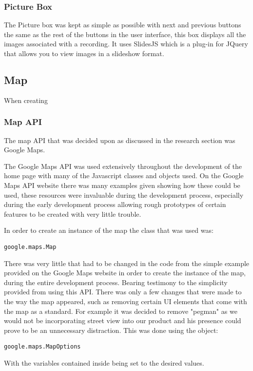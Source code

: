 \documentclass{l3proj}
\begin{document}
\subsubsection{Picture Box}

The Picture box was kept as simple as possible with next and previous buttons the same as the rest of the buttons in the user interface, this box displays all the images associated with a recording. It uses SlidesJS which is a plug-in for JQuery that allows you to view images in a slideshow format.

\subsection{Map}

When creating

\subsubsection{Map API}

The map API that was decided upon as discussed in the research section was Google Maps.

The Google Maps API was used extensively throughout the development of the home page with many of the Javascript classes and objects used. On the Google Maps API website there was many examples given showing how these could be used, these resources were invaluable during the development process, especially during the early development process allowing rough prototypes of certain features to be created with very little trouble.

In order to create an instance of the map the class that was used was:
\begin{verbatim}
google.maps.Map
\end{verbatim}
There was very little that had to be changed in the code from the simple example provided on the Google Maps website in order to create the instance of the map, during the entire development process. Bearing testimony to the simplicity provided from using this API. There was only a few changes that were made to the way the map appeared, such as removing certain UI elements that come with the map as a standard. For example it was decided to remove "pegman" as we would not be incorporating street view into our product and his presence could prove to be an unnecessary distraction. This was done
using the object:
\begin{verbatim}
google.maps.MapOptions
\end{verbatim}
With the variables contained inside being set to the desired values.
\end{document}

